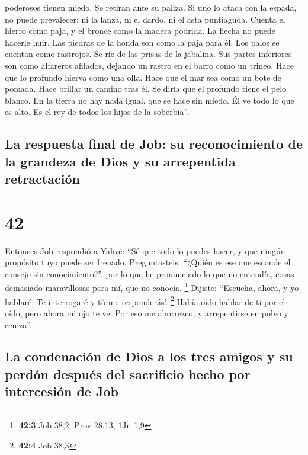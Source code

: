 poderosos tienen miedo. Se retiran ante su paliza.  Si
uno lo ataca con la espada, no puede prevalecer; ni la lanza, ni el
dardo, ni el asta puntiaguda.  Cuenta el hierro como
paja, y el bronce como la madera podrida.  La flecha no
puede hacerle huir. Las piedras de la honda son como la paja para él.
 Los palos se cuentan como rastrojos. Se ríe de las
prisas de la jabalina.  Sus partes inferiores son como
alfareros afilados, dejando un rastro en el barro como un trineo.
 Hace que lo profundo hierva como una olla. Hace que el
mar sea como un bote de pomada.  Hace brillar un camino
tras él. Se diría que el profundo tiene el pelo blanco. 
En la tierra no hay nada igual, que se hace sin miedo. 
Él ve todo lo que es alto. Es el rey de todos los hijos de la
soberbia''.

\hypertarget{la-respuesta-final-de-job-su-reconocimiento-de-la-grandeza-de-dios-y-su-arrepentida-retractaciuxf3n}{%
\subsection{La respuesta final de Job: su reconocimiento de la grandeza
de Dios y su arrepentida
retractación}\label{la-respuesta-final-de-job-su-reconocimiento-de-la-grandeza-de-dios-y-su-arrepentida-retractaciuxf3n}}

\hypertarget{section-41}{%
\section{42}\label{section-41}}

 Entonces Job respondió a Yahvé:  ``Sé que
todo lo puedes hacer, y que ningún propósito tuyo puede ser frenado.
 Preguntasteis: ``¿Quién es ese que esconde el consejo sin
conocimiento?''. por lo que he pronunciado lo que no entendía, cosas
demasiado maravillosas para mí, que no conocía. \footnote{\textbf{42:3}
  Job 38,2; Prov 28,13; 1Jn 1,9}  Dijiste: ``Escucha,
ahora, y yo hablaré; Te interrogaré y tú me responderás'. \footnote{\textbf{42:4}
  Job 38,3}  Había oído hablar de ti por el oído, pero
ahora mi ojo te ve.  Por eso me aborrezco, y arrepentirse
en polvo y ceniza''.

\hypertarget{la-condenaciuxf3n-de-dios-a-los-tres-amigos-y-su-perduxf3n-despuuxe9s-del-sacrificio-hecho-por-intercesiuxf3n-de-job}{%
\subsection{La condenación de Dios a los tres amigos y su perdón después
del sacrificio hecho por intercesión de
Job}\label{la-condenaciuxf3n-de-dios-a-los-tres-amigos-y-su-perduxf3n-despuuxe9s-del-sacrificio-hecho-por-intercesiuxf3n-de-job}}

